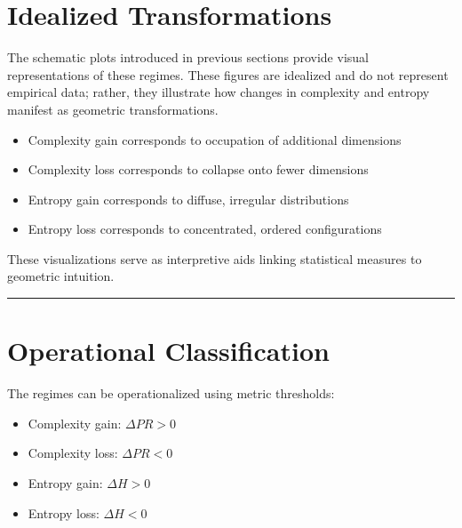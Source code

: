 \documentclass[
  letterpaper,
  DIV=11,
  numbers=noendperiod,
  openany,
  oneside]{scrreprt}
\providecommand{\tightlist}{%
  \setlength{\itemsep}{0pt}\setlength{\parskip}{0pt}}
\begin{document}
\section{Idealized Transformations}\label{idealized-transformations}

The schematic plots introduced in previous sections provide visual
representations of these regimes. These figures are idealized and do not
represent empirical data; rather, they illustrate how changes in
complexity and entropy manifest as geometric transformations.

\begin{itemize}
\tightlist
\item
  Complexity gain corresponds to occupation of additional dimensions\\
\item
  Complexity loss corresponds to collapse onto fewer dimensions\\
\item
  Entropy gain corresponds to diffuse, irregular distributions\\
\item
  Entropy loss corresponds to concentrated, ordered configurations
\end{itemize}

These visualizations serve as interpretive aids linking statistical
measures to geometric intuition.

\begin{center}\rule{0.5\linewidth}{0.5pt}\end{center}

\section{Operational Classification}\label{operational-classification}

The regimes can be operationalized using metric thresholds:

\begin{itemize}
\tightlist
\item
  Complexity gain: \(\Delta PR > 0\)\\
\item
  Complexity loss: \(\Delta PR < 0\)\\
\item
  Entropy gain: \(\Delta H > 0\)\\
\item
  Entropy loss: \(\Delta H < 0\)
\end{itemize}
\end{document}
